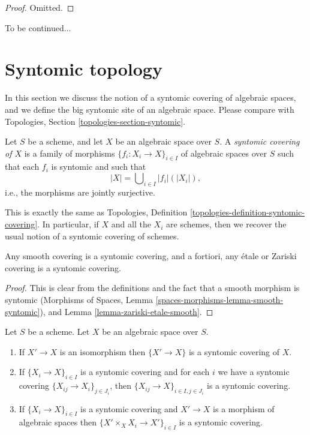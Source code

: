 \begin{proof}
Omitted.
\end{proof}

\noindent
To be continued...









\section{Syntomic topology}
\label{section-syntomic}

\noindent
In this section we discuss the notion of a syntomic covering of
algebraic spaces, and we define the big syntomic site of an
algebraic space. Please compare with
Topologies, Section \ref{topologies-section-syntomic}.

\begin{definition}
\label{definition-syntomic-covering}
Let $S$ be a scheme, and let $X$ be an algebraic space over $S$.
A {\it syntomic covering of $X$} is a family of morphisms
$\{f_i : X_i \to X\}_{i \in I}$ of algebraic spaces over $S$
such that each $f_i$ is syntomic
and such that
$$
|X| = \bigcup\nolimits_{i \in I} |f_i|(|X_i|),
$$
i.e., the morphisms are jointly surjective.
\end{definition}

\noindent
This is exactly the same as
Topologies, Definition \ref{topologies-definition-syntomic-covering}.
In particular, if $X$ and all the $X_i$ are schemes, then we recover the
usual notion of a syntomic covering of schemes.

\begin{lemma}
\label{lemma-zariski-etale-smooth-syntomic}
Any smooth covering is a syntomic covering, and a fortiori,
any \'etale or Zariski covering is a syntomic covering.
\end{lemma}

\begin{proof}
This is clear from the definitions and the fact that a smooth
morphism is syntomic
(Morphisms of Spaces, Lemma \ref{spaces-morphisms-lemma-smooth-syntomic}),
and Lemma \ref{lemma-zariski-etale-smooth}.
\end{proof}

\begin{lemma}
\label{lemma-syntomic}
Let $S$ be a scheme.
Let $X$ be an algebraic space over $S$.
\begin{enumerate}
\item If $X' \to X$ is an isomorphism then $\{X' \to X\}$
is a syntomic covering of $X$.
\item If $\{X_i \to X\}_{i\in I}$ is a syntomic covering and for each
$i$ we have a syntomic covering $\{X_{ij} \to X_i\}_{j\in J_i}$, then
$\{X_{ij} \to X\}_{i \in I, j\in J_i}$ is a syntomic covering.
\item If $\{X_i \to X\}_{i\in I}$ is a syntomic covering
and $X' \to X$ is a morphism of algebraic spaces then
$\{X' \times_X X_i \to X'\}_{i\in I}$ is a syntomic covering.
\end{enumerate}
\end{lemma}

